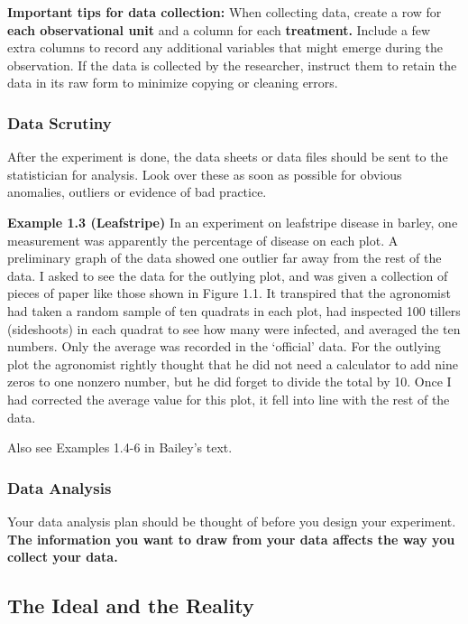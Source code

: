 \documentclass[12pt, oneside]{article}
\begin{document}
\textbf{Important tips for data collection:}
When collecting data, create a row for \textbf{each observational unit} and a column for each \textbf{treatment.} Include a few extra columns to record any additional variables that might emerge during the observation. If the data is collected by the researcher, instruct them to retain the data in its raw form to minimize copying or cleaning errors. 

\subsubsection{Data Scrutiny}

After the experiment is done, the data sheets or data files should be sent to the statistician
for analysis. Look over these as soon as possible for obvious anomalies, outliers or evidence
of bad practice.

\textbf{Example 1.3 (Leafstripe)} In an experiment on leafstripe disease in barley, one measurement
was apparently the percentage of disease on each plot. A preliminary graph of the data showed
one outlier far away from the rest of the data. I asked to see the data for the outlying plot, and
was given a collection of pieces of paper like those shown in Figure 1.1. It transpired that the
agronomist had taken a random sample of ten quadrats in each plot, had inspected 100 tillers
(sideshoots) in each quadrat to see how many were infected, and averaged the ten numbers.
Only the average was recorded in the ‘official’ data. For the outlying plot the agronomist
rightly thought that he did not need a calculator to add nine zeros to one nonzero number, but
he did forget to divide the total by 10. Once I had corrected the average value for this plot, it
fell into line with the rest of the data.

Also see Examples 1.4-6 in Bailey's text.

\subsubsection{Data Analysis}

Your data analysis plan should be thought of before you design your experiment. \textbf{The information you want to draw from your data affects the way you collect your data.} 

\subsection{The Ideal and the Reality}
\end{document}
